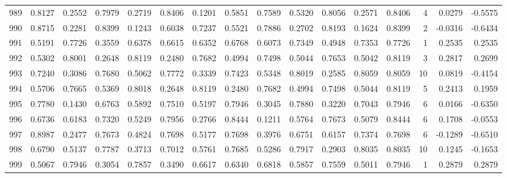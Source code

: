 \begin{tabular}{lrrrrrrrrrrrrrrr}
989 &      0.8127 &  0.2552 &  0.7979 &  0.2719 &  0.8406 &  0.1201 &  0.5851 &  0.7589 &  0.5320 &  0.8056 &   0.2571 &     0.8406 &      4 &                    0.0279 &                    -0.5575 \\
990 &      0.8715 &  0.2281 &  0.8399 &  0.1243 &  0.6038 &  0.7237 &  0.5521 &  0.7886 &  0.2702 &  0.8193 &   0.1624 &     0.8399 &      2 &                   -0.0316 &                    -0.6434 \\
991 &      0.5191 &  0.7726 &  0.3559 &  0.6378 &  0.6615 &  0.6352 &  0.6768 &  0.6073 &  0.7349 &  0.4948 &   0.7353 &     0.7726 &      1 &                    0.2535 &                     0.2535 \\
992 &      0.5302 &  0.8001 &  0.2648 &  0.8119 &  0.2480 &  0.7682 &  0.4994 &  0.7498 &  0.5044 &  0.7653 &   0.5042 &     0.8119 &      3 &                    0.2817 &                     0.2699 \\
993 &      0.7240 &  0.3086 &  0.7680 &  0.5062 &  0.7772 &  0.3339 &  0.7423 &  0.5348 &  0.8019 &  0.2585 &   0.8059 &     0.8059 &     10 &                    0.0819 &                    -0.4154 \\
994 &      0.5706 &  0.7665 &  0.5369 &  0.8018 &  0.2648 &  0.8119 &  0.2480 &  0.7682 &  0.4994 &  0.7498 &   0.5044 &     0.8119 &      5 &                    0.2413 &                     0.1959 \\
995 &      0.7780 &  0.1430 &  0.6763 &  0.5892 &  0.7510 &  0.5197 &  0.7946 &  0.3045 &  0.7880 &  0.3220 &   0.7043 &     0.7946 &      6 &                    0.0166 &                    -0.6350 \\
996 &      0.6736 &  0.6183 &  0.7320 &  0.5249 &  0.7956 &  0.2766 &  0.8444 &  0.1211 &  0.5764 &  0.7673 &   0.5079 &     0.8444 &      6 &                    0.1708 &                    -0.0553 \\
997 &      0.8987 &  0.2477 &  0.7673 &  0.4824 &  0.7698 &  0.5177 &  0.7698 &  0.3976 &  0.6751 &  0.6157 &   0.7374 &     0.7698 &      6 &                   -0.1289 &                    -0.6510 \\
998 &      0.6790 &  0.5137 &  0.7787 &  0.3713 &  0.7012 &  0.5761 &  0.7685 &  0.5286 &  0.7917 &  0.2903 &   0.8035 &     0.8035 &     10 &                    0.1245 &                    -0.1653 \\
999 &      0.5067 &  0.7946 &  0.3054 &  0.7857 &  0.3490 &  0.6617 &  0.6340 &  0.6818 &  0.5857 &  0.7559 &   0.5011 &     0.7946 &      1 &                    0.2879 &                     0.2879 \\
\bottomrule
\end{tabular}
